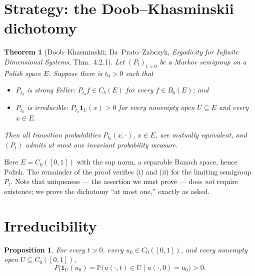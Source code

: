 \documentclass[11pt]{article}
\newtheorem{theorem}{Theorem}
\newtheorem{proposition}{Proposition}
\newcommand{\PP}{\mathbb{P}}
\newcommand{\C}{C_0([0,1])}
\begin{document}
\section{Strategy: the Doob--Khasminskii dichotomy}

\begin{theorem}[Doob--Khasminskii; Da~Prato--Zabczyk, \emph{Ergodicity for
Infinite Dimensional Systems}, Thm.~4.2.1]\label{thm:doob}
Let $(P_t)_{t>0}$ be a Markov semigroup on a Polish space $E$. Suppose there is
$t_0>0$ such that
\begin{itemize}
\item[(i)] $P_{t_0}$ is \emph{strong Feller}: $P_{t_0}f\in C_b(E)$ for every
$f\in B_b(E)$; and
\item[(ii)] $P_{t_0}$ is \emph{irreducible}: $P_{t_0}\mathbf 1_{U}(x)>0$ for
every nonempty open $U\subseteq E$ and every $x\in E$.
\end{itemize}
Then all transition probabilities $P_{t_0}(x,\cdot)$, $x\in E$, are mutually
equivalent, and $(P_t)$ admits \emph{at most one} invariant probability measure.
\end{theorem}

Here $E=\C$ with the sup norm, a separable Banach space, hence Polish. The
remainder of the proof verifies (i) and (ii) for the limiting semigroup $P_t$.
Note that uniqueness — the assertion we must prove — does \emph{not} require
existence; we prove the dichotomy ``at most one,'' exactly as asked.

\section{Irreducibility}\label{sec:irr}

\begin{proposition}\label{prop:irr}
For every $t>0$, every $u_0\in\C$, and every nonempty open $U\subseteq\C$,
\[
P_t\mathbf 1_U(u_0)=\PP\big(u(\cdot,t)\in U\mid u(\cdot,0)=u_0\big)>0 .
\]
\end{proposition}
\end{document}

